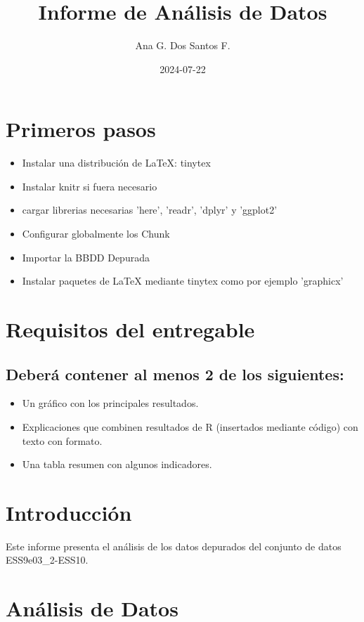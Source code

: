 \documentclass{article}\usepackage[]{graphicx}\usepackage[]{xcolor}
\title{Informe de Análisis de Datos}
\author{Ana G. Dos Santos F.}
\date{2024-07-22}
\begin{document}
\maketitle

\section*{Primeros pasos}

\begin{itemize}
\item Instalar una distribución de \LaTeX{}: tinytex
\item Instalar knitr si fuera necesario
\item cargar librerias necesarias 'here', 'readr', 'dplyr' y 'ggplot2'
\item Configurar globalmente los Chunk
\item Importar la BBDD Depurada
\item Instalar paquetes de \LaTeX{} mediante tinytex como por ejemplo 'graphicx'
\end{itemize}





\section{Requisitos del entregable}
\subsection{Deberá contener al menos 2 de los siguientes:}

\begin{itemize}
\item Un gráfico con los principales resultados.
\item Explicaciones que combinen resultados de R (insertados mediante código) con texto con formato.
\item Una tabla resumen con algunos indicadores.
\end{itemize}

\section{Introducción}
Este informe presenta el análisis de los datos depurados del conjunto de datos ESS9e03\_2-ESS10.

\section{Análisis de Datos}
\end{document}
